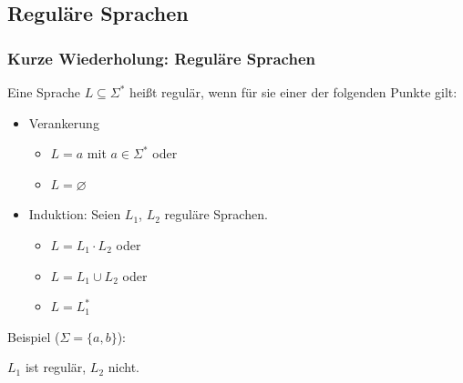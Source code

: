 \subsection{Reguläre Sprachen}
\begin{frame}
 \frametitle{Kurze Wiederholung: Reguläre Sprachen}

        Eine Sprache \(L\subseteq\Sigma^*\) heißt regulär, wenn für sie einer der folgenden Punkte gilt:

\begin{itemize}
\item Verankerung
      \begin{itemize}
      \item \(L = {a}\) mit \(a\in\Sigma^*\) oder
      \item \(L = \varnothing \)
      \end{itemize}
\item Induktion: Seien \(L_1\), \(L_2\) reguläre Sprachen.
      \begin{itemize}
      \item \(L = L_1 \cdot L_2\) oder
      \item \(L = L_1 \cup L_2\) oder
      \item \(L = L_1^*\)
      \end{itemize}
\end{itemize}

Beispiel ($\Sigma = \{a,b\}$):

	
	$L_1$ ist regulär, $L_2$ nicht.
\end{frame}

